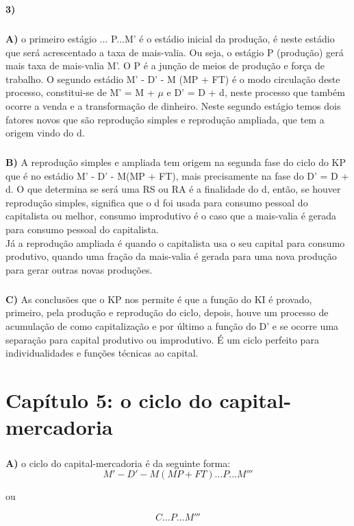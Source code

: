 \documentclass[a4paper, 12pt]{article} %
\begin{document}
\par \textbf{3)}

\subparagraph{} \textbf{A)} o primeiro estágio ... P...M' é o estádio inicial da produção, é neste estádio que será acrescentado a taxa de mais-valia. Ou seja, o estágio P (produção) gerá mais taxa de mais-valia M'. O P é a junção de meios de produção e força de trabalho. O segundo estádio M' - D' - M (MP + FT) é o modo circulação deste processo, constitui-se de M' = M + $\mu$ e D' = D + d, neste processo que também ocorre a venda e a transformação de dinheiro. Neste segundo estágio temos dois fatores novos que são reprodução simples e reprodução ampliada, que tem a origem vindo do d.

\subparagraph{} \textbf{B)} A reprodução simples e ampliada tem origem na segunda fase do ciclo do KP que é no estádio M' - D' - M(MP + FT), mais precisamente na fase do D' = D + d. O que determina se será uma RS ou RA é a finalidade do d, então, se houver reprodução simples, significa que o d foi usada para consumo pessoal do capitalista ou melhor, consumo improdutivo é o caso que a mais-valia é gerada para consumo pessoal do capitalista.
\\
Já a reprodução ampliada é quando o capitalista usa o seu capital para consumo produtivo, quando uma fração da mais-valia é gerada para uma nova produção para gerar outras novas produções.

\subparagraph{} \textbf{C)} As conclusões que o KP nos permite é que a função do KI é provado, primeiro, pela produção e reprodução do ciclo, depois, houve um processo de acumulação de como capitalização e por último a função do D' e se ocorre uma separação para capital produtivo ou improdutivo. É um ciclo perfeito para individualidades e funções técnicas ao capital.

\vspace{0.5cm}

\par \section{Capítulo 5: o ciclo do capital-mercadoria}
\vspace{0.5cm}

\subparagraph{} \textbf{A)} o ciclo do capital-mercadoria é da seguinte forma: 
\begin{equation}
M' - D' - M (MP + FT) ... P ... M'''
\end{equation}
\begin{center}
ou
\end{center} 
\begin{equation}
C ... P ... M'''
\end{equation}
\end{document}
